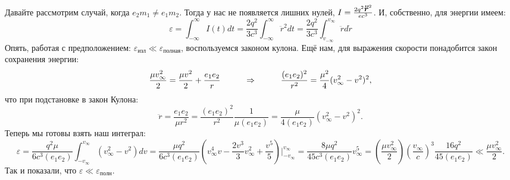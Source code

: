Давайте рассмотрим случай, когда $e_2 m_1 \neq e_1 m_2$. Тогда у нас не появляется лишних нулей, $I = \frac{ 2 q^2 \mbox{\boldmath $\ddot{r}$}^2}{e c^3}$. И, собственно, для энергии имеем:
\begin{equation*}
	\varepsilon = \int_{-\infty}^{\infty} I(t) dt = \frac{2 q^2}{3 c^3} \int_{-\infty}^{\infty} \ddot{r}^2 d t
	=
	\frac{2 q^2}{3 c^3} \int_{v_{-\infty}}^{v_{\infty}} \ddot{r} d \dot{r}
\end{equation*}
Опять, работая с предположением: $\varepsilon_{\text{изл}}\ll \varepsilon_{\text{полная}}$, воспользуемся законом кулона. Ещё нам, для выражения скорости понадобится закон сохранения энергии:
\begin{equation*}
	\frac{\mu v^2_\infty}{2} = \frac{\mu v^2}{2} + \frac{e_1 e_2}{r}
	\hspace{1 cm}
	\Rightarrow
	\hspace{1 cm}
	\frac{(e_1 e_2)^2}{r^2} = \frac{\mu^2}{4} (v_\infty^2 - v^2)^2,
\end{equation*}
что при подстановке в закон Кулона:
\begin{equation*}
	\ddot{r} = \frac{e_1 e_2}{\mu r^2} = \frac{(e_1 e_2)^2}{r^2} \frac{1}{\mu (e_1 e_2)}
	=
	\frac{\mu}{4 (e_1 e_2)} (v_\infty^2 - v^2)^2.
\end{equation*}
Теперь мы готовы взять наш интеграл:
\begin{equation*}
	\varepsilon = \frac{q^2 \mu}{6 c^3 (e_1 e_2)} \int_{- v_\infty}^{v_\infty} (v_\infty^2 - v^2) d v
	=
	\frac{\mu q^2}{6 c^3 (e_1 e_2)} \left(v_\infty^4 v - \frac{2 v^{3}}{3} v_\infty^2 + \frac{v^5}{5}\right) \bigg|_{-v_\infty}^{v_\infty}
	=
	\frac{8 \mu q^2}{45 c^3 (e_1 e_2)} v_\infty^5
	=
	\left(\frac{\mu v_\infty^2}{2}\right) \left(\frac{v_\infty}{c}\right)^3 \frac{16 q^2}{45 (e_1 e_2)}
	\ll \frac{\mu v_\infty^2}{2}.
\end{equation*}
Так и показали, что $\varepsilon \ll \varepsilon_{\text{полн}}$.